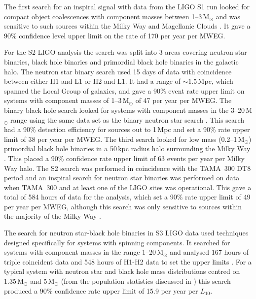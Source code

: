 \documentclass{article}
\begin{document}
The first search for an inspiral signal with data from the LIGO S1 run looked
for compact object coalescences with component masses between 1--3\,M$_{\odot}$
and was sensitive to such sources within the Milky Way and Magellanic Clouds
\cite{Abbott:2004c}. It gave a 90\% confidence level upper limit on the rate of
170 per year per MWEG.

For the S2 LIGO analysis the search was split into 3 areas covering neutron star
binaries, black hole binaries and primordial black hole binaries in the galactic
halo. The neutron star binary search \cite{Abbott:2005b} used 15 days of data
with coincidence between either H1 and L1 or H2 and L1. It had a range of
$\sim1.5$\,Mpc, which spanned the Local Group of galaxies, and gave a 90\% event
rate upper limit on systems with component masses of 1--3\,M$_{\odot}$ of 47 per
year per MWEG. The binary black hole search looked for systems with component
masses in the 3--20\,M$_{\odot}$ range using the same data set as the binary
neutron star search \cite{Abbott:2006a}. This search had a 90\% detection
efficiency for sources out to 1\,Mpc and set a 90\% rate upper limit of 38 per
year per MWEG. The third search looked for low mass (0.2--1\,M$_{\odot}$)
primordial black hole binaries in a 50\,kpc radius halo surrounding the Milky
Way \cite{Abbott:2005e}. This placed a 90\% confidence rate upper limit of 63
events per year per Milky Way halo. The S2 search was performed in coincidence
with the TAMA~300 DT8 period and an inspiral search for neutron star binaries was
performed on data when TAMA~300 and at least one of the LIGO sites was
operational. This gave a total of 584 hours of data for the analysis, which set
a 90\% rate upper limit of 49 per year per MWEG, although this search was only
sensitive to sources within the majority of the Milky Way \cite{Abbott:2006b}.

The search for neutron star-black hole binaries in S3 LIGO data used techniques
designed specifically for systems with spinning components. It searched for
systems with component masses in the range 1--20\,M$_{\odot}$ and analysed 167
hours of triple coincident data and 548 hours of H1-H2 data to set the upper
limits \cite{Abbott:2008d}. For a typical system with neutron star and black
hole mass distributions centred on 1.35\,M$_{\odot}$ and 5\,M$_{\odot}$ (from
the population statistics discussed in \cite{Abbott:2008a}) this search produced
a 90\% confidence rate upper limit of 15.9 per year per $L_{10}$.
\end{document}
